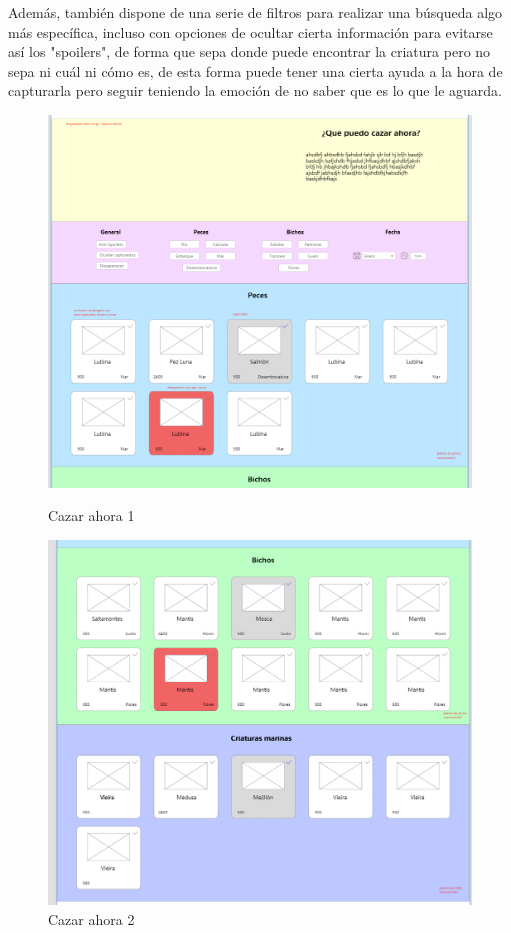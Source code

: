 Además, también dispone de una serie de filtros para realizar una búsqueda algo más específica, incluso con opciones de ocultar cierta información para evitarse así los "spoilers", de forma que sepa donde puede encontrar la criatura pero no sepa ni cuál ni cómo es, de esta forma puede tener una cierta ayuda a la hora de capturarla pero seguir teniendo la emoción de no saber que es lo que le aguarda.\\

\begin{figure}[!htb]
	\begin{minipage}{0.48\textwidth}
		\centering
		\includegraphics[width=\linewidth]{img/mockups/Cazar Ahora - 1.png}
		\caption{Cazar ahora 1}
		\label{fig:cazarahora1}
	\end{minipage}\hfill
	\begin{minipage}{0.48\textwidth}
		\centering
		\includegraphics[width=\linewidth]{img/mockups/Cazar Ahora - 2.png}
		\caption{Cazar ahora 2}
		\label{fig:cazarahora2}
	\end{minipage}
\end{figure}

